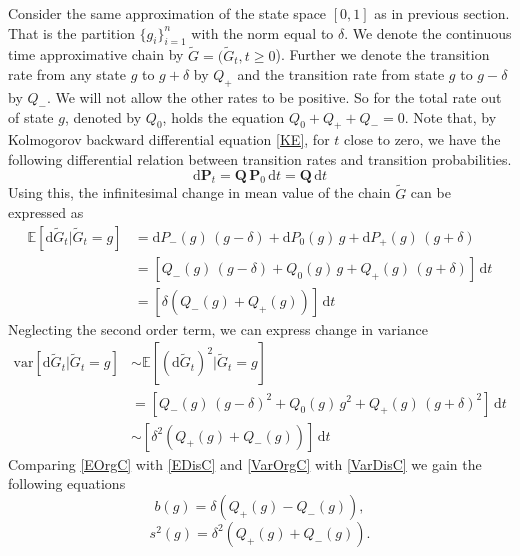 Consider the same approximation of the state space $[0,1]$ as in previous section. That is the partition $\{g_i\}_{i=1}^{n}$ with the norm equal to $\delta$. We denote the continuous time approximative chain by $\widetilde{G}=(\widetilde{G}_t,t\geq0$). Further we denote the transition rate from any state $g$ to $g+\delta$ by $Q_+$ and the transition rate from state $g$ to $g-\delta$ by $Q_-$. We will not allow the other rates to be positive. So for the total rate out of state $g$, denoted by $Q_0$, holds the equation $Q_0 + Q_+ + Q_- =0$. Note that, by Kolmogorov backward differential equation \eqref{KE}, for $t$ close to zero, we have the following differential relation between transition rates and transition probabilities. 
\[\mathrm{d}\bm{P}_t=\bm{Q}\,\bm{P}_{0}\,\mathrm{d} t=\bm{Q}\,\mathrm{d}t\]
Using this, the infinitesimal change in mean value of the chain $\widetilde{G}$ can be expressed as
\begin{equation}
\label{EDisC}
\begin{split}
\mathbb{E}[\mathrm{d}\widetilde{G}_{t}|\widetilde{G}_{t}=g]&=\mathrm{d}P_{-}(g)\,(g-\delta)+\mathrm{d}P_{0}(g)\,g+\mathrm{d}P_{+}(g)\,(g+\delta)\\
&=[Q_{-}(g)\,(g-\delta)+Q_{0}(g)\,g+Q_{+}(g)\,(g+\delta)]\,\mathrm{d}t\\
&=[\delta(Q_{-}(g)+Q_{+}(g))]\,\mathrm{d}t
\end{split}
\end{equation}
Neglecting the second order term, we can express change in variance
\begin{equation}
\label{VarDisC}
\begin{split}
\text{var}[\mathrm{d}\widetilde{G}_{t}|\widetilde{G}_{t}=g]&\sim\mathbb{E}[(\mathrm{d}\widetilde{G}_{t})^2|\widetilde{G}_{t}=g]\\
&=[Q_{-}(g)\,(g-\delta)^2+Q_{0}(g)\,g^2+Q_{+}(g)\,(g+\delta)^2]\,\mathrm{d}t\\
&\sim [\delta^2(Q_{+}(g)+Q_{-}(g))]\,\mathrm{d}t
\end{split}
\end{equation}
Comparing \eqref{EOrgC} with \eqref{EDisC} and \eqref{VarOrgC} with \eqref{VarDisC} we gain the following equations
\begin{equation*}
b(g)= \delta(Q_{+}(g)-Q_{-}(g)),
\end{equation*}
\begin{equation*}
s^2(g)= \delta^2(Q_{+}(g)+Q_{-}(g)).
\end{equation*}
